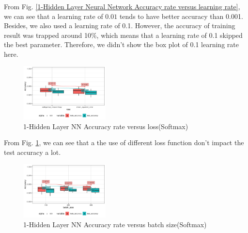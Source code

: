 \documentclass[conference]{IEEEtran}
\begin{document}
From Fig. \ref{1-Hidden Layer Neural Network Accuracy rate versus learning rate}, we can see that a learning rate of $0.01$ tends to have better accuracy than 0.001. Besides, we also used a learning rate of 0.1. However, the accuracy of training result was trapped around 10\%, which means that a learning rate of 0.1 skipped the best parameter. Therefore, we didn't show the box plot of 0.1 learning rate here.
\begin{figure}[htbp]
\centerline{\includegraphics[width=0.4\textwidth]{figure/1-Hidden Layer Neural Network Accuracy rate versus loss.png}}
\caption{1-Hidden Layer NN Accuracy rate versus loss(Softmax)}
\label{1-Hidden Layer Neural Network Accuracy rate versus loss}
\end{figure}
From Fig. \ref{1-Hidden Layer Neural Network Accuracy rate versus loss}, we can see that a the use of different loss function don't impact the test accuracy a lot.

\begin{figure}[htbp]
\centerline{\includegraphics[width=0.4\textwidth]{figure/1-Hidden Layer Neural Network Accuracy rate versus batch_size.png}}
\caption{1-Hidden Layer NN Accuracy rate versus batch size(Softmax)}
\label{1-Hidden Layer Neural Network Accuracy rate batch size loss}
\end{figure}
\end{document}
